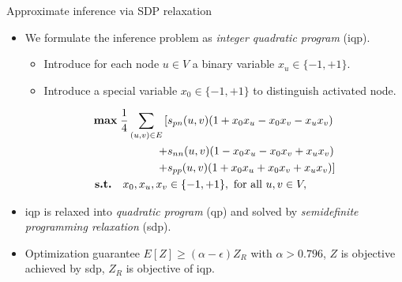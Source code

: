 \documentclass[first=dgreen,second=purple,logo=red]{aaltoslides}
\begin{document}
%
\begin{frame}[allowframebreaks]{Approximate inference via {\sc SDP} relaxation}
	\begin{itemize}\footnotesize
		\item We formulate the inference problem as {\it integer quadratic program} ({\sc iqp}).
		\begin{itemize}\footnotesize
			\item Introduce for each node $u\in V$ a binary variable $x_u\in\{-1,+1\}$.
			\item Introduce a special variable $x_0\in\{-1,+1\}$ to distinguish activated node.
		\end{itemize}
		{\scriptsize
		\begin{align*}
		\textbf{max} \; \frac{1}{4} \sum_{(u, v)\in E}\, [ & s_{\sc pn}(u,v) (1 + x_0 x_u - x_0 x_v - x_u x_v)  \\ 
			+ & s_{\sc nn}(u,v) (1 - x_0 x_u - x_0 x_v + x_u x_v)  \\ 
			+ & s_{\sc pp}(u,v) (1 + x_0 x_u + x_0 x_v + x_u x_v) ] \\
		\textbf{s.t.} \quad  x_0, x_u, x_v &\in \{-1,+1\}, \text{ for all } u,v\in V,
		\end{align*}}
		\item {\sc iqp} is relaxed into {\em quadratic program} ({\sc qp}) and solved by {\it semidefinite programming relaxation} ({\sc sdp}).
		\item Optimization guarantee $E[Z] \ge (\alpha-\epsilon) Z_{R} $ with $\alpha>0.796$, $Z$ is objective achieved by {\sc sdp}, $Z_R$ is objective of {\sc iqp}.
	\end{itemize}
\end{frame}
\end{document}
